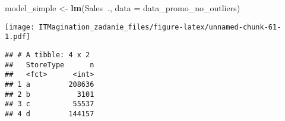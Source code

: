 \documentclass[]{article}
\newenvironment{Shaded}{\begin{snugshade}}{\end{snugshade}}
\newcommand{\DataTypeTok}[1]{\textcolor[rgb]{0.13,0.29,0.53}{#1}}
\newcommand{\DecValTok}[1]{\textcolor[rgb]{0.00,0.00,0.81}{#1}}
\newcommand{\KeywordTok}[1]{\textcolor[rgb]{0.13,0.29,0.53}{\textbf{#1}}}
\newcommand{\NormalTok}[1]{#1}
\newcommand{\OperatorTok}[1]{\textcolor[rgb]{0.81,0.36,0.00}{\textbf{#1}}}
\newcommand{\StringTok}[1]{\textcolor[rgb]{0.31,0.60,0.02}{#1}}
\begin{document}
\begin{Shaded}
\begin{Highlighting}[]
\NormalTok{model_simple <-}\StringTok{ }\KeywordTok{lm}\NormalTok{(Sales}\OperatorTok{~}\NormalTok{., }\DataTypeTok{data =}\NormalTok{ data_promo_no_outliers)}
\end{Highlighting}
\end{Shaded}

\begin{Shaded}
\end{Shaded}

\texttt{[image: ITMagination\_zadanie\_files/figure-latex/unnamed-chunk-61-1.pdf]}

\begin{Shaded}
\end{Shaded}

\begin{Shaded}
\end{Shaded}

\begin{verbatim}
## # A tibble: 4 x 2
##   StoreType      n
##   <fct>      <int>
## 1 a         208636
## 2 b           3101
## 3 c          55537
## 4 d         144157
\end{verbatim}
\end{document}
